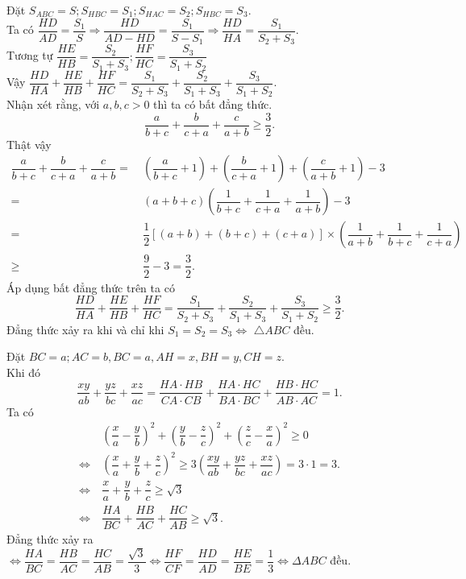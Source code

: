 \begin{bt}
{\begin{listEX}
\item Đặt $ S_{ABC}=S; S_{HBC}=S_1;S_{HAC}=S_2;S_{HBC} =S_3.$\\
Ta có $ \dfrac{HD}{AD} =\dfrac{S_1}{S} \Rightarrow \dfrac{HD}{AD-HD}=\dfrac{S_1}{S-S_1}\Rightarrow \dfrac{HD}{HA}=\dfrac{S_1}{S_2+S_3}. $\\
Tương tự $ \dfrac{HE}{HB}=\dfrac{S_2}{S_1+S_3};\dfrac{HF}{HC}=\dfrac{S_3}{S_1+S_2} $\\
Vậy $ \dfrac{HD}{HA}+\dfrac{HE}{HB}+\dfrac{HF}{HC}=\dfrac{S_1}{S_2+S_3}+\dfrac{S_2}{S_1+S_3} +\dfrac{S_3}{S_1+S_2}$.\\
Nhận xét rằng, với $ a,b,c>0  $ thì ta có bất đẳng thức.
$$ \dfrac{a}{b+c} +\dfrac{b}{c+a}+\dfrac{c}{a+b} \ge \dfrac{3}{2}. $$
Thật vậy
{\allowdisplaybreaks
\begin{align*}
\dfrac{a}{b+c} +\dfrac{b}{c+a}+\dfrac{c}{a+b} =\ &\left( \dfrac{a}{b+c}+1\right)+\left( \dfrac{b}{c+a}+1\right)+\left( \dfrac{c}{a+b}+1\right)-3\\
=\ &(a+b+c)\left(\dfrac{1}{b+c}+\dfrac{1}{c+a}+\dfrac{1}{a+b}\right)-3\\
=\ &\dfrac{1}{2}\left[ (a+b)+(b+c)+(c+a)\right]\times \left(\dfrac{1}{a+b}+\dfrac{1}{b+c}+\dfrac{1}{c+a}\right)\\
\ge\ & \dfrac{9}{2}-3=\dfrac{3}{2}.      
\end{align*}}Áp dụng bất đẳng thức trên ta có
$$\dfrac{HD}{HA}+\dfrac{HE}{HB}+\dfrac{HF}{HC}=\dfrac{S_1}{S_2+S_3}+\dfrac{S_2}{S_1+S_3}+\dfrac{S_3}{S_1+S_2} \ge \dfrac{3}{2}.$$
Đẳng thức xảy ra khi và chỉ khi $ S_1=S_2=S_3\Leftrightarrow $ $\triangle ABC$ đều.
\item Đặt $ BC=a;AC =b,BC =a,AH =x, BH=y, CH =z. $\\
Khi đó 
$$ \dfrac{xy}{ab}+\dfrac{yz}{bc}+\dfrac{xz}{ac} =\dfrac{HA\cdot HB}{CA\cdot CB}+\dfrac{HA\cdot HC}{BA\cdot BC}+\dfrac{HB\cdot HC}{AB\cdot AC}=1. $$
Ta có
\begin{align*}
&\left( \dfrac{x}{a}-\dfrac{y}{b}\right)^2+\left(\dfrac{y}{b}-\dfrac{z}{c}\right)^2+\left(\dfrac{z}{c}- \dfrac{x}{a}\right)^2\ge 0 \\
\Leftrightarrow\ & \left( \dfrac{x}{a}+\dfrac{y}{b}+\dfrac{z}{c}\right)^2\ge 3\left(\dfrac{xy}{ab}+\dfrac{yz}{bc}+\dfrac{xz}{ac}\right)  =3\cdot 1=3.\\
\Leftrightarrow\ & \dfrac{x}{a}+\dfrac{y}{b}+\dfrac{z}{c} \ge \sqrt{3}\\
\Leftrightarrow\ & \dfrac{HA}{BC}+\dfrac{HB}{AC}+\dfrac{HC}{AB}\ge \sqrt{3}.
\end{align*}
Đẳng thức xảy ra $ \Leftrightarrow \dfrac{HA}{BC}=\dfrac{HB}{AC}=\dfrac{HC}{AB}=\dfrac{\sqrt{3}}{3}\Leftrightarrow \dfrac{HF}{CF}= \dfrac{HD}{AD}=\dfrac{HE}{BE}=\dfrac{1}{3}\Leftrightarrow \Delta ABC $ đều.

\end{listEX}}
\end{bt}
